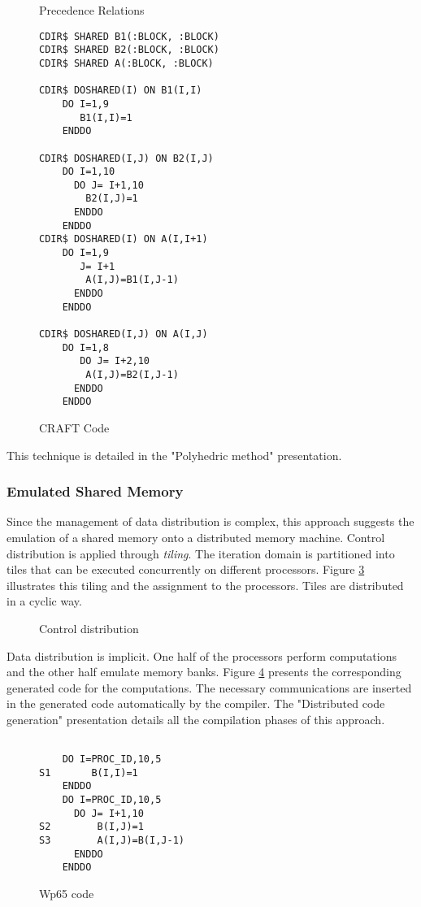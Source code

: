 \begin{figure}[htp]
\caption{Precedence Relations}
\label{plac}
\end{figure}

\begin{figure}[htp]
\begin{verbatim}
CDIR$ SHARED B1(:BLOCK, :BLOCK)
CDIR$ SHARED B2(:BLOCK, :BLOCK)
CDIR$ SHARED A(:BLOCK, :BLOCK)

CDIR$ DOSHARED(I) ON B1(I,I)
    DO I=1,9
       B1(I,I)=1
    ENDDO

CDIR$ DOSHARED(I,J) ON B2(I,J)
    DO I=1,10
      DO J= I+1,10
        B2(I,J)=1
      ENDDO
    ENDDO  
CDIR$ DOSHARED(I) ON A(I,I+1)
    DO I=1,9
       J= I+1
        A(I,J)=B1(I,J-1)
      ENDDO
    ENDDO  

CDIR$ DOSHARED(I,J) ON A(I,J)
    DO I=1,8
       DO J= I+2,10
        A(I,J)=B2(I,J-1)
      ENDDO
    ENDDO  
\end{verbatim}
\caption{CRAFT Code}
\label{plac2}
\end{figure}

This technique is detailed in the "Polyhedric method" presentation.

\subsubsection{Emulated Shared Memory}


Since the management of data  distribution is complex, this approach suggests
 the emulation of a shared memory onto a
distributed memory machine. Control distribution is applied through {\it 
tiling}. The iteration domain is partitioned into tiles that can be executed 
concurrently on different processors. Figure \ref{wp65d} illustrates this 
tiling and the assignment to the processors.  Tiles  are distributed in
 a cyclic way. 

\begin{figure}[htp]
\caption{Control distribution}
\label{wp65d}
\end{figure}


Data distribution is implicit.  One half of the processors perform
computations and the other half emulate memory banks.
Figure \ref{wp65c} presents the corresponding generated code for the 
computations. The necessary communications are inserted in the generated code 
automatically by the compiler. The "Distributed code generation" presentation 
 details all the compilation phases of this approach.


\begin{figure}[htp]
\begin{verbatim}

    DO I=PROC_ID,10,5
S1       B(I,I)=1
    ENDDO
    DO I=PROC_ID,10,5
      DO J= I+1,10
S2        B(I,J)=1
S3        A(I,J)=B(I,J-1)
      ENDDO
    ENDDO  
\end{verbatim}
\caption{Wp65 code}
\label{wp65c}
\end{figure}

%
